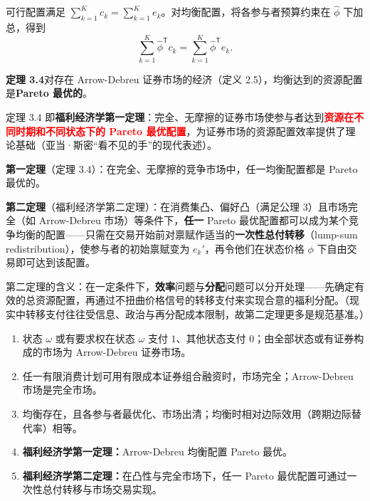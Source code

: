 \begin{tcolorbox}[example]
\end{tcolorbox}



\begin{tcolorbox}[knowledge,title=3.5 市场均衡（续）]
可行配置满足 $\sum_{k=1}^{K}c_k=\sum_{k=1}^{K}e_k$。对均衡配置，将各参与者预算约束在 $\hat{\phi}$ 下加总，得到
\[
    \sum_{k=1}^{K}\hat{\phi}^{\mathsf T}c_k=\sum_{k=1}^{K}\hat{\phi}^{\mathsf T}e_k.
    \tag{3.10}
\]

\begin{tcolorbox}[knowledge]
\textbf{定理 3.4}\quad 对存在 Arrow-Debreu 证券市场的经济（定义 2.5），均衡达到的资源配置是\textbf{Pareto 最优的}。
\end{tcolorbox}

定理 3.4 即\textbf{福利经济学第一定理}：完全、无摩擦的证券市场使参与者达到\textcolor{red}{\textbf{资源在不同时期和不同状态下的 Pareto 最优配置}}，为证券市场的资源配置效率提供了理论基础（亚当·斯密“看不见的手”的现代表述）。

\begin{tcolorbox}[knowledge,title=福利经济学两大定理]
\textbf{第一定理}（定理 3.4）：在完全、无摩擦的竞争市场中，任一均衡配置都是 Pareto 最优的。

\textbf{第二定理}（福利经济学第二定理）：在消费集凸、偏好凸（满足公理 3）且市场完全（如 Arrow-Debreu 市场）等条件下，\textbf{任一} Pareto 最优配置都可以成为某个竞争均衡的配置——只需在交易开始前对禀赋作适当的\textbf{一次性总付转移}（lump-sum redistribution），使参与者的初始禀赋变为 $e_k'$，再令他们在状态价格 $\phi$ 下自由交易即可达到该配置。

第二定理的含义：在一定条件下，\textbf{效率}问题与\textbf{分配}问题可以分开处理——先确定有效的总资源配置，再通过不扭曲价格信号的转移支付来实现合意的福利分配。（现实中转移支付往往受信息、政治与再分配成本限制，故第二定理更多是规范基准。）
\end{tcolorbox}


\end{tcolorbox}

\begin{tcolorbox}[knowledge,title=本章小结]
\begin{enumerate}
    \item 状态 $\omega$ 或有要求权在状态 $\omega$ 支付 $1$、其他状态支付 $0$；由全部状态或有证券构成的市场为 Arrow-Debreu 证券市场。
    \item 任一有限消费计划可用有限成本证券组合融资时，市场完全；Arrow-Debreu 市场是完全市场。
    \item 均衡存在，且各参与者最优化、市场出清；均衡时相对边际效用（跨期边际替代率）相等。
    \item \textbf{福利经济学第一定理：}Arrow-Debreu 均衡配置 Pareto 最优。
    \item \textbf{福利经济学第二定理：}在凸性与完全市场下，任一 Pareto 最优配置可通过一次性总付转移与市场交易实现。
\end{enumerate}
\end{tcolorbox}
\fi


